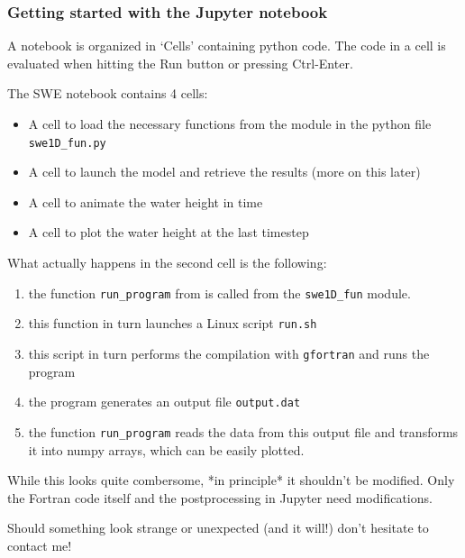 \documentclass[aspectratio=43,9pt]{beamer}
\begin{document}
%
%
\begin{frame}
	\frametitle{Getting started with the Jupyter notebook}
	\begin{myitemize}{2ex}
		\item A notebook is organized in `Cells' containing python code. The code in a cell is evaluated when hitting the Run button or pressing Ctrl-Enter.
		\item The SWE notebook contains 4 cells:
			\begin{itemize}
				\item A cell to load the necessary functions from the module in the python file \texttt{swe1D\_fun.py}\vspace*{1ex}
				\item A cell to launch the model and retrieve the results (more on this later)\vspace*{1ex}
				\item A cell to animate the water height in time\vspace*{1ex}
				\item A cell to plot the water height at the last timestep
			\end{itemize}
		\item What actually happens in the second cell is the following:
			\begin{enumerate}
				\item the function \texttt{run\_program} from is called from the \texttt{swe1D\_fun} module.\vspace*{1ex}
				\item this function in turn launches a Linux script \texttt{run.sh}\vspace*{1ex}
				\item this script in turn performs the compilation with \texttt{gfortran} and runs the program\vspace*{1ex}
				\item the program generates an output file \texttt{output.dat}\vspace*{1ex}
				\item the function \texttt{run\_program} reads the data from this output file and transforms it into numpy arrays, which can be easily plotted.\vspace*{1ex}
			\end{enumerate}
			While this looks quite combersome, *in principle* it shouldn't be modified. Only the Fortran code itself and the postprocessing in Jupyter need modifications.\vspace*{1ex}
			\par
			Should something look strange or unexpected (and it will!) don't hesitate to contact me!
	\end{myitemize}
\end{frame}
%
%
\end{document}
